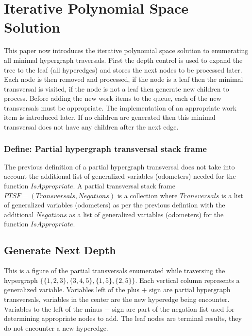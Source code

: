 \chapter{Iterative Polynomial Space Solution}

This paper now introduces the iterative polynomial space solution to enumerating all minimal hypergraph traversals. First the depth control is used to expand the tree to the leaf (all hyperedges) and stores the next nodes to be processed later. Each node is then removed and processed, if the node is a leaf then the minimal transversal is visited, if the node is not a leaf then generate new children to process. Before adding the new work items to the queue, each of the new transversals must be appropriate. The implementation of an appropriate work item is introduced later. If no children are generated then this minimal transversal does not have any children after the next edge. 

\subsection{Define: Partial hypergraph transversal stack frame}
The previous definition of a partial hypergraph transversal does not take into account the additional list of generalized variables (odometers) needed for the function $IsAppropriate$.
A partial transversal stack frame $PTSF = (Transversals,Negations)$ is a collection where $Transversals$ is a list of generalized variables (odometers) as per the previous defintion with the additional $Negations$ as a list of generalized variables (odometers) for the function $IsAppropriate$.\\



\newpage
\section{Generate Next Depth}
This is a figure of the partial transversals enumerated while traversing the hypergraph $\{\{1,2,3\},\{3,4,5\},\{1,5\},\{2,5\}\}$. Each vertical column represents a generalized variable. Variables left of the plus $+$ sign are partial hypergraph transversals, variables in the center are the new hyperedge being encounter. Variables to the left of the minus $-$ sign are part of the negation list used for determining appropriate nodes to add. The leaf nodes are terminal results, they do not encounter a new hyperedge.\\

